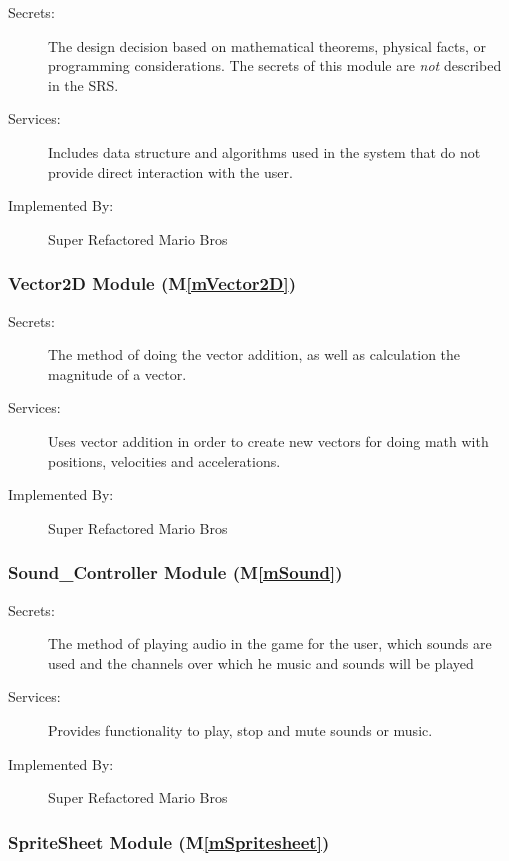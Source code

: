 \documentclass[12pt, titlepage]{article}
\newcommand{\mref}[1]{M\ref{#1}}
\begin{document}
\begin{description}
\item[Secrets:] The design decision based on mathematical theorems, physical
  facts, or programming considerations. The secrets of this module are
  \emph{not} described in the SRS.
\item[Services:] Includes data structure and algorithms used in the system that
  do not provide direct interaction with the user.
\item[Implemented By:] Super Refactored Mario Bros
\end{description}

\subsubsection{Vector2D Module (\mref{mVector2D})}

\begin{description}
\item[Secrets:] The method of doing the vector addition, as well as calculation the magnitude of a vector.
\item[Services:] Uses vector addition in order to create new vectors for doing math with positions, velocities and accelerations.
\item[Implemented By:] Super Refactored Mario Bros
\end{description}

\subsubsection{Sound\_Controller Module (\mref{mSound})}

\begin{description}
\item[Secrets:] The method of playing audio in the game for the user, which sounds are used and the channels over which he music and sounds will be played
\item[Services:] Provides functionality to play, stop and mute sounds or music.
\item[Implemented By:] Super Refactored Mario Bros
\end{description}

\subsubsection{SpriteSheet Module (\mref{mSpritesheet})}
\end{document}
